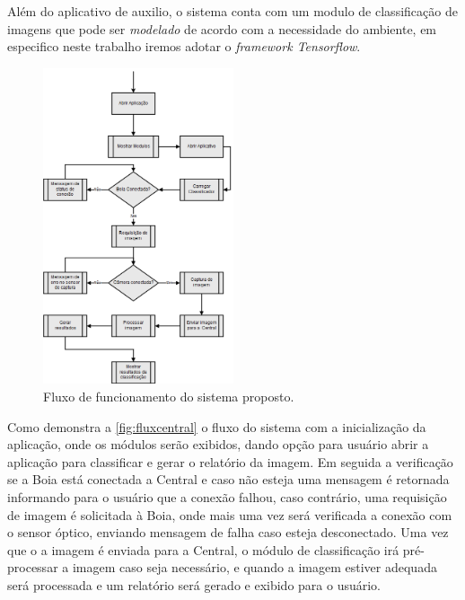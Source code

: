 Além do aplicativo de auxilio, o sistema conta com um modulo de classificação de imagens que pode ser \textit{modelado} de acordo com a necessidade do ambiente, em especifico neste trabalho iremos adotar o \textit{framework Tensorflow}. 



\begin{figure}[ht]
	\caption{\label{fig:fluxcentral}  Fluxo de funcionamento do sistema proposto.}
	 \begin{center}
		\includegraphics[width = 0.5\textwidth]			{resources/Fluxo-central}
    \end{center}
\end{figure}

Como demonstra a \autoref{fig:fluxcentral} o fluxo do sistema com a inicialização da aplicação, onde os módulos serão exibidos, dando opção para usuário abrir a aplicação para classificar e gerar o relatório da imagem. Em seguida a verificação se a Boia está conectada a Central e caso não esteja uma mensagem é retornada informando para o usuário que a conexão falhou, caso contrário, uma requisição de imagem é solicitada à Boia, onde mais uma vez será verificada a conexão com o sensor óptico, enviando mensagem de falha caso esteja desconectado. Uma vez que o a imagem é enviada para a Central, o módulo de classificação irá pré-processar a imagem caso seja necessário, e quando a imagem estiver adequada será processada e um relatório será gerado e exibido para o usuário.

